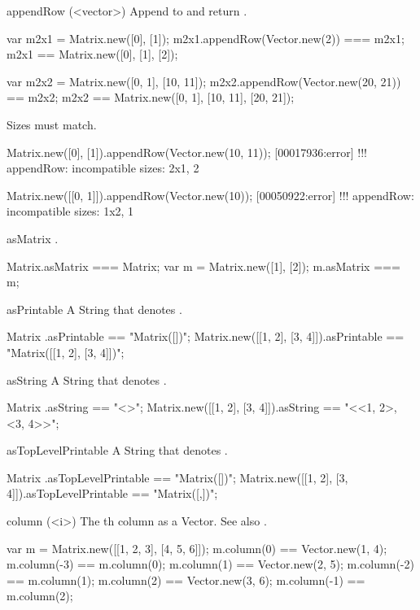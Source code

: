 \begin{urbiscriptapi}
\item[appendRow](<vector>)%
  Append  to \this and return \this.
\begin{urbiassert}
var m2x1 = Matrix.new([0], [1]);
m2x1.appendRow(Vector.new(2)) === m2x1;
m2x1 == Matrix.new([0], [1], [2]);

var m2x2 = Matrix.new([0, 1], [10, 11]);
m2x2.appendRow(Vector.new(20, 21)) == m2x2;
m2x2 == Matrix.new([0, 1], [10, 11], [20, 21]);
\end{urbiassert}

  Sizes must match.
\begin{urbiscript}
Matrix.new([0], [1]).appendRow(Vector.new(10, 11));
[00017936:error] !!! appendRow: incompatible sizes: 2x1, 2

Matrix.new([[0, 1]]).appendRow(Vector.new(10));
[00050922:error] !!! appendRow: incompatible sizes: 1x2, 1
\end{urbiscript}


\item[asMatrix]%
  \this.
\begin{urbiassert}
Matrix.asMatrix === Matrix;
var m = Matrix.new([1], [2]);
m.asMatrix === m;
\end{urbiassert}


\item[asPrintable]%
  A String that denotes \this.
\begin{urbiassert}
Matrix                      .asPrintable == "Matrix([])";
Matrix.new([[1, 2], [3, 4]]).asPrintable == "Matrix([[1, 2], [3, 4]])";
\end{urbiassert}


\item[asString]%
  A String that denotes \this.
\begin{urbiassert}
Matrix                      .asString == "<>";
Matrix.new([[1, 2], [3, 4]]).asString == "<<1, 2>, <3, 4>>";
\end{urbiassert}


\item[asTopLevelPrintable]%
  A String that denotes \this.
\begin{urbiassert}
Matrix                      .asTopLevelPrintable
  == "Matrix([])";
Matrix.new([[1, 2], [3, 4]]).asTopLevelPrintable
 == "Matrix([\n  [1, 2],\n  [3, 4]])";
\end{urbiassert}


\item[column](<i>)%
  The th column as a Vector.  See also .
\begin{urbiassert}
var m = Matrix.new([[1, 2, 3], [4, 5, 6]]);
m.column(0) == Vector.new(1, 4);  m.column(-3) == m.column(0);
m.column(1) == Vector.new(2, 5);  m.column(-2) == m.column(1);
m.column(2) == Vector.new(3, 6);  m.column(-1) == m.column(2);


\end{urbiassert}
\end{urbiscriptapi}
